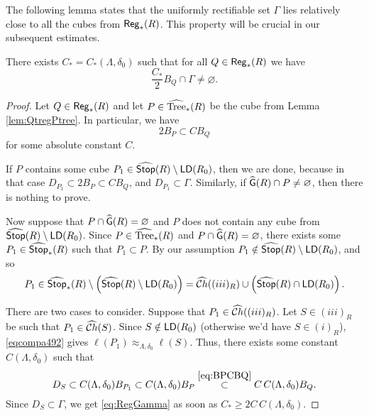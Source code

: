 The following lemma states that the uniformly rectifiable set $\Gamma$ lies relatively close to all the cubes from ${\mathsf{Reg}}_*(R)$. This property will be crucial in our subsequent estimates.
\begin{lemma}\label{lem:RegGamma}
	There exists $C_*=C_*(\Lambda,\delta_0)$ such that for all $Q\in{\mathsf{Reg}}_*(R)$ we have
	\begin{equation}\label{eq:RegGamma}
	\frac{C_*}{2}B_Q\cap\Gamma\neq\varnothing.
	\end{equation}
\end{lemma}
\begin{proof}
	Let $Q\in{\mathsf{Reg}}_*(R)$ and let $P\in{\widehat{{\rm Tree}}}_*(R)$ be the cube from Lemma \ref{lem:QtregPtree}.
	In particular, we have
	\begin{equation}\label{eq:BPCBQ}
	2B_P\subset C B_Q
	\end{equation}
	for some absolute constant $C$.
	
	If $P$ contains some cube $P_1\in{\widehat{{\mathsf{Stop}}}}(R)\setminus{\mathsf{LD}}(R_0)$, then we are done, because in that case $D_{P_1}\subset 2B_P\subset C B_Q$, and $D_{P_1}\subset\Gamma$. Similarly, if ${\widehat{{\mathsf G}}}(R)\cap P\neq\varnothing$, then there is nothing to prove.
	
	Now suppose that $P\cap{\widehat{{\mathsf G}}}(R)=\varnothing$ and $P$ does not contain any cube from ${\widehat{{\mathsf{Stop}}}}(R)\setminus{\mathsf{LD}}(R_0)$. Since $P\in{\widehat{{\rm Tree}}}_*(R)$ and $P\cap{\widehat{{\mathsf G}}}(R)=\varnothing$, there exists some $P_1\in{\widehat{{\mathsf {Stop}}}}_*(R)$ such that $P_1\subset P$. By our assumption $P_1\notin{\widehat{{\mathsf {Stop}}}}(R)\setminus{\mathsf{LD}}(R_0)$, and so
	\begin{equation*}
	P_1\in {\widehat{{\mathsf {Stop}}}}_*(R)\setminus \left({\widehat{{\mathsf {Stop}}}}(R)\setminus{\mathsf{LD}}(R_0)\right) = {\widehat{{\mathcal Ch}}}((iii)_R) \cup \left({\widehat{{\mathsf {Stop}}}}(R)\cap{\mathsf{LD}}(R_0)\right).
	\end{equation*}
	
	There are two cases to consider. Suppose that $P_1\in{\widehat{{\mathcal Ch}}}((iii)_R)$. Let $S\in (iii)_R$ be such that $P_1\in{\widehat{{\mathcal Ch}}}(S)$. Since $S\notin{\mathsf{LD}}(R_0)$ (otherwise we'd have $S\in (i)_R$), \eqref{eqcompa492} gives $\ell(P_1)\approx_{\Lambda,\delta_0}\ell(S)$. Thus, there exists some constant  $C(\Lambda,\delta_0)$ such that
	\begin{equation*}
	D_S\subset C(\Lambda,\delta_0)B_{P_1}\subset C(\Lambda,\delta_0)B_{P}\overset{\eqref{eq:BPCBQ}}{\subset}C\, C(\Lambda,\delta_0) B_Q.
	\end{equation*}
	Since $D_S\subset\Gamma$, we get \eqref{eq:RegGamma} as soon as $C_*\ge 2C\, C(\Lambda,\delta_0)$.
	

\end{proof}
